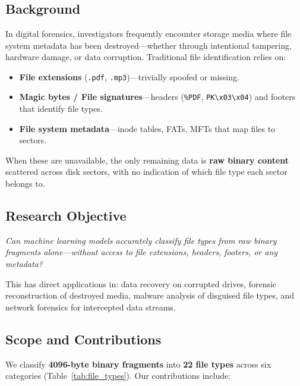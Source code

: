 \documentclass[12pt,a4paper]{report}
\begin{document}
\chapter{}
\begin{normalsize}
\noindent

\section{Background}
{\setlength{\baselineskip}{1.0\baselineskip}
In digital forensics, investigators frequently encounter storage media where file system metadata has been destroyed---whether through intentional tampering, hardware damage, or data corruption. Traditional file identification relies on:

\begin{itemize}[noitemsep]
    \item \textbf{File extensions} (\texttt{.pdf}, \texttt{.mp3})---trivially spoofed or missing.
    \item \textbf{Magic bytes / File signatures}---headers (\texttt{\%PDF}, \texttt{PK\textbackslash x03\textbackslash x04}) and footers that identify file types.
    \item \textbf{File system metadata}---inode tables, FATs, MFTs that map files to sectors.
\end{itemize}

When these are unavailable, the only remaining data is \textbf{raw binary content} scattered across disk sectors, with no indication of which file type each sector belongs to.
\par}

\section{Research Objective}
{\setlength{\baselineskip}{1.0\baselineskip}
\textit{Can machine learning models accurately classify file types from raw binary fragments alone---without access to file extensions, headers, footers, or any metadata?}

This has direct applications in: data recovery on corrupted drives, forensic reconstruction of destroyed media, malware analysis of disguised file types, and network forensics for intercepted data streams.
\par}

\section{Scope and Contributions}
{\setlength{\baselineskip}{1.0\baselineskip}
We classify \textbf{4096-byte binary fragments} into \textbf{22 file types} across six categories (Table~\ref{tab:file_types}). Our contributions include:

}
\end{normalsize}
\end{document}
